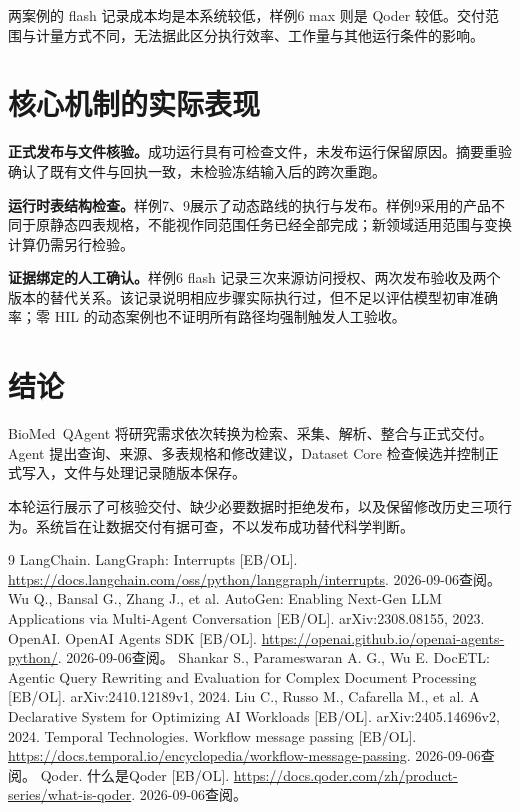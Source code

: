 两案例的 flash 记录成本均是本系统较低，样例6 max 则是 Qoder 较低。交付范围与计量方式不同，无法据此区分执行效率、工作量与其他运行条件的影响。

\section{核心机制的实际表现}

\textbf{正式发布与文件核验。}成功运行具有可检查文件，未发布运行保留原因。摘要重验确认了既有文件与回执一致，未检验冻结输入后的跨次重跑。

\textbf{运行时表结构检查。}样例7、9展示了动态路线的执行与发布。样例9采用的产品不同于原静态四表规格，不能视作同范围任务已经全部完成；新领域适用范围与变换计算仍需另行检验。

\textbf{证据绑定的人工确认。}样例6 flash 记录三次来源访问授权、两次发布验收及两个版本的替代关系。该记录说明相应步骤实际执行过，但不足以评估模型初审准确率；零 HIL 的动态案例也不证明所有路径均强制触发人工验收。

\section{结论}

\mbox{BioMed QAgent} 将研究需求依次转换为检索、采集、解析、整合与正式交付。Agent 提出查询、来源、多表规格和修改建议，Dataset Core 检查候选并控制正式写入，文件与处理记录随版本保存。

本轮运行展示了可核验交付、缺少必要数据时拒绝发布，以及保留修改历史三项行为。系统旨在让数据交付有据可查，不以发布成功替代科学判断。

\renewcommand{\bibname}{参考文献}
\begin{thebibliography}{9}
 LangChain. LangGraph: Interrupts [EB/OL]. \url{https://docs.langchain.com/oss/python/langgraph/interrupts}. 2026-09-06查阅。
 Wu Q., Bansal G., Zhang J., et al. AutoGen: Enabling Next-Gen LLM Applications via Multi-Agent Conversation [EB/OL]. arXiv:2308.08155, 2023.
 OpenAI. OpenAI Agents SDK [EB/OL]. \url{https://openai.github.io/openai-agents-python/}. 2026-09-06查阅。
 Shankar S., Parameswaran A. G., Wu E. DocETL: Agentic Query Rewriting and Evaluation for Complex Document Processing [EB/OL]. arXiv:2410.12189v1, 2024.
 Liu C., Russo M., Cafarella M., et al. A Declarative System for Optimizing AI Workloads [EB/OL]. arXiv:2405.14696v2, 2024.
 Temporal Technologies. Workflow message passing [EB/OL]. \url{https://docs.temporal.io/encyclopedia/workflow-message-passing}. 2026-09-06查阅。
 Qoder. 什么是Qoder [EB/OL]. \url{https://docs.qoder.com/zh/product-series/what-is-qoder}. 2026-09-06查阅。
\end{thebibliography}
